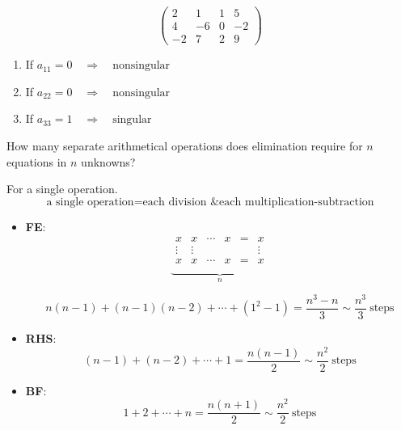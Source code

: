 \newpage

\begin{eg}
\[
\left(
\begin{matrix}
    2 & 1 & 1 & 5 \\
    4 & -6 & 0 & -2 \\
    -2 & 7 & 2 & 9
\end{matrix}
\right)
\]
\end{eg}

\begin{enumerate}[label=(\arabic*)]
    \item If $a_{11} = 0 \quad \Longrightarrow \quad \text{nonsingular}$
    \item If $a_{22} = 0 \quad \Longrightarrow \quad \text{nonsingular}$
    \item If $a_{33} = 1 \quad \Longrightarrow \quad \text{singular}$
\end{enumerate}

\begin{exercise}
    How many separate arithmetical operations does elimination require for $n$ equations in $n$ unknowns?
\end{exercise}
\begin{answer}
    For a single operation.
    \[
    \text{a single operation} = \text{each division \& each multiplication-subtraction}
    \]
\end{answer}

\begin{itemize}
    \item \textbf{FE}: 
    \[
    \underbrace{
    \begin{matrix}
        x & x & \cdots & x &= &x \\
        \vdots & \vdots & & & & \vdots\\
        x & x & \cdots & x &= &x \\
    \end{matrix}
    }_{n}
    \]

    \[
    n(n-1) + (n-1)(n-2) + \cdots +(1^2-1) = \frac{n^3-n}{3} \sim \frac{n^3}{3} \ \text{steps}
    \]

    \item \textbf{RHS}: \[
    (n-1) + (n-2) + \cdots + 1 = \frac{n(n-1)}{2} \sim \frac{n^2}{2} \ \text{steps}
    \]
    \item \textbf{BF}:
    \[
    1 + 2 + \cdots + n = \frac{n(n+1)}{2} \sim \frac{n^2}{2} \ \text{steps}
    \]
\end{itemize}

\newpage

